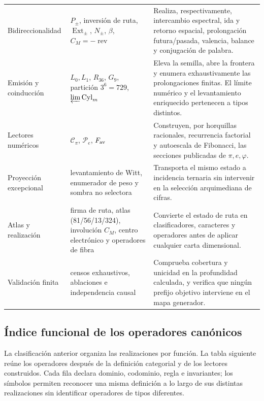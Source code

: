 \begin{longtable}{@{}p{}p{}p{}@{}}
Bidireccionalidad &
\(P_\pm\), inversión de ruta, \(\operatorname{Ext}_\pm\),
\(N_\pm\), \(\beta\), \(C_M=-\operatorname{rev}\) &
Realiza, respectivamente, intercambio espectral, ida y retorno espacial,
prolongación futura/pasada, valencia, balance y conjugación de palabra. \\

Emisión y coinducción &
\(L_0,L_1\), \(R_{36}\), \(G_9\), partición \(3^6=729\),
\(\varprojlim\operatorname{Cyl}_m\) &
Eleva la semilla, abre la frontera y enumera exhaustivamente las
prolongaciones finitas. El límite numérico y el levantamiento enriquecido
pertenecen a tipos distintos. \\

Lectores numéricos &
\(\mathscr C_\pi\), \(\mathscr P_e\), \(F_{\rm av}\) &
Construyen, por horquillas racionales, recurrencia factorial y autoescala de
Fibonacci, las secciones publicadas de \(\pi,e,\varphi\). \\

Proyección excepcional &
levantamiento de Witt, enumerador de peso y sombra no selectora &
Transporta el mismo estado a incidencia ternaria sin intervenir en la
selección arquimediana de cifras. \\

Atlas y realización &
firma de ruta, atlas (81/56/13/324), involución \(C_M\), centro
electrónico y operadores de fibra &
Convierte el estado de ruta en clasificadores, caracteres y operadores antes de
aplicar cualquier carta dimensional. \\

Validación finita &
censos exhaustivos, ablaciones e independencia causal &
Comprueba cobertura y unicidad en la profundidad calculada, y verifica que
ningún prefijo objetivo interviene en el mapa generador. \\
\bottomrule
\end{longtable}
\endgroup

\subsection{Índice funcional de los operadores canónicos}

La clasificación anterior organiza las realizaciones por función. La tabla siguiente
reúne los operadores después de la definición categorial y de los lectores
construidos. Cada fila declara dominio, codominio, regla e invariantes; los
símbolos permiten reconocer una misma definición a lo largo de sus
distintas realizaciones sin identificar operadores de tipos diferentes.


